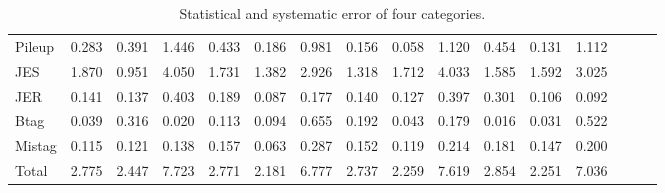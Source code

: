 \begin{sidewaystable}[p]
\begin{tabular}{|l|ccc|ccc|ccc|ccc|ccc|}
  Pileup                                     & 0.283 & 0.391 & 1.446 & 0.433 & 0.186 & 0.981 & 0.156 & 0.058 & 1.120 & 0.454 & 0.131 & 1.112 \\ 
  JES                                        & 1.870 & 0.951 & 4.050 & 1.731 & 1.382 & 2.926 & 1.318 & 1.712 & 4.033 & 1.585 & 1.592 & 3.025 \\ 
  JER                                        & 0.141 & 0.137 & 0.403 & 0.189 & 0.087 & 0.177 & 0.140 & 0.127 & 0.397 & 0.301 & 0.106 & 0.092 \\ 
  Btag                                       & 0.039 & 0.316 & 0.020 & 0.113 & 0.094 & 0.655 & 0.192 & 0.043 & 0.179 & 0.016 & 0.031 & 0.522 \\ 
  Mistag                                     & 0.115 & 0.121 & 0.138 & 0.157 & 0.063 & 0.287 & 0.152 & 0.119 & 0.214 & 0.181 & 0.147 & 0.200 \\ 
  \hline
  Total                                      & 2.775 & 2.447 & 7.723 & 2.771 & 2.181 & 6.777 & 2.737 & 2.259 & 7.619 & 2.854 & 2.251 & 7.036 \\ 
  \hline
  \end{tabular}
  \caption{ Statistical and systematic error of four categories. }
  \label{tab:syst_alt}
\end{sidewaystable}
